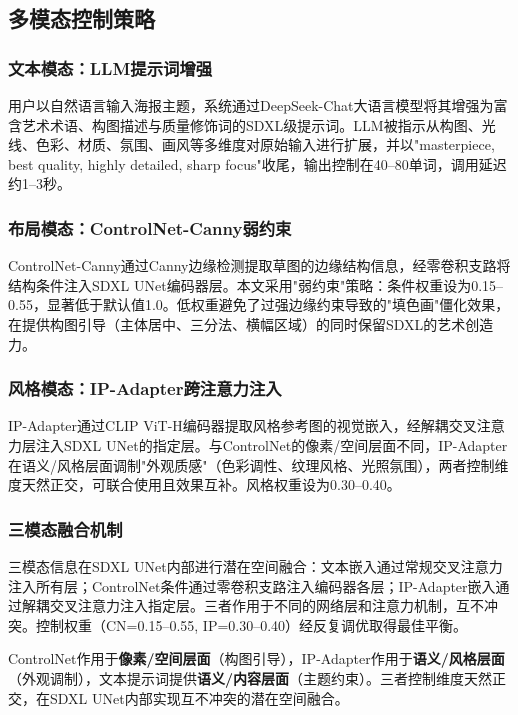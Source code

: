 \documentclass[12pt,a4paper]{ctexart}
\begin{document}
\subsection{多模态控制策略}

\subsubsection{文本模态：LLM提示词增强}

用户以自然语言输入海报主题，系统通过DeepSeek-Chat大语言模型将其增强为富含艺术术语、构图描述与质量修饰词的SDXL级提示词。LLM被指示从构图、光线、色彩、材质、氛围、画风等多维度对原始输入进行扩展，并以"masterpiece, best quality, highly detailed, sharp focus"收尾，输出控制在40--80单词，调用延迟约1--3秒。

\subsubsection{布局模态：ControlNet-Canny弱约束}

ControlNet-Canny通过Canny边缘检测提取草图的边缘结构信息，经零卷积支路将结构条件注入SDXL UNet编码器层。本文采用"弱约束"策略：条件权重设为0.15--0.55，显著低于默认值1.0。低权重避免了过强边缘约束导致的"填色画"僵化效果，在提供构图引导（主体居中、三分法、横幅区域）的同时保留SDXL的艺术创造力。

\subsubsection{风格模态：IP-Adapter跨注意力注入}

IP-Adapter通过CLIP ViT-H编码器提取风格参考图的视觉嵌入，经解耦交叉注意力层注入SDXL UNet的指定层。与ControlNet的像素/空间层面不同，IP-Adapter在语义/风格层面调制"外观质感"（色彩调性、纹理风格、光照氛围），两者控制维度天然正交，可联合使用且效果互补。风格权重设为0.30--0.40。

\subsubsection{三模态融合机制}

三模态信息在SDXL UNet内部进行潜在空间融合：文本嵌入通过常规交叉注意力注入所有层；ControlNet条件通过零卷积支路注入编码器各层；IP-Adapter嵌入通过解耦交叉注意力注入指定层。三者作用于不同的网络层和注意力机制，互不冲突。控制权重（CN=0.15--0.55, IP=0.30--0.40）经反复调优取得最佳平衡。

\begin{keybox}[三模态协同控制的核心设计原则]
ControlNet作用于\textbf{像素/空间层面}（构图引导），IP-Adapter作用于\textbf{语义/风格层面}（外观调制），文本提示词提供\textbf{语义/内容层面}（主题约束）。三者控制维度天然正交，在SDXL UNet内部实现互不冲突的潜在空间融合。
\end{keybox}
\end{document}
